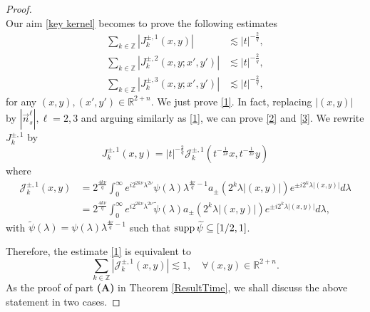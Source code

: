 \documentclass[10pt,a4paper]{amsart}
\def\supp{\hbox{supp\,}}
\begin{document}
\begin{proof}
\begin{equation*}
\end{equation*}
Our aim \eqref{key kernel} becomes to prove the following estimates
\begin{align}
\sum_{k\in\mathbb{Z}}|J_k^{\pm,1}(x,y)|&\lesssim |t|^{-\frac{2}{q}},\label{1}\\
\sum_{k\in\mathbb{Z}}|J_k^{\pm,2}(x,y;x',y')|&\lesssim |t|^{-\frac{2}{q}},\label{2}\\
\sum_{k\in\mathbb{Z}}|J_k^{\pm,3}(x,y;x',y')|&\lesssim |t|^{-\frac{2}{q}},\label{3}
\end{align}
for any $(x,y),(x',y')\in\mathbb{R}^{2+n}$. We just prove \eqref{1}. In fact, replacing $|(x,y)|$ by $|\overset{\rightarrow}{n}_s^\ell|, \ell=2,3$ and arguing similarly as \eqref{1}, we can prove \eqref{2} and \eqref{3}. We rewrite $J_k^{\pm,1}$ by
\begin{equation*}
J_k^{\pm,1}(x,y)=|t|^{-\frac{2}{q}}\mathcal{J}_k^{\pm,1}(t^{-\frac{1}{2\nu}}x,t^{-\frac{1}{2\nu}}y)
\end{equation*}
where
\begin{align*}
\mathcal{J}_k^{\pm,1}(x,y)&=2^\frac{4k\nu}{q}\int_0^\infty  e^{i2^{2k\nu}\lambda^{2\nu}} \psi(\lambda)\lambda^{\frac{4\nu}{q}-1}a_{\pm}(2^k\lambda|(x,y)|)e^{\pm i2^k\lambda|(x,y)|}d\lambda\\
&=2^\frac{4k\nu}{q}\int_0^\infty  e^{i2^{2k\nu}\lambda^{2\nu}} \widetilde{\psi}(\lambda)a_{\pm}(2^k\lambda|(x,y)|)e^{\pm i2^k\lambda|(x,y)|}d\lambda,
\end{align*}
with $\widetilde{\psi}(\lambda)=\psi(\lambda)\lambda^{\frac{4\nu}{q}-1}$ such that $\supp \widetilde{\psi}\subseteq [1/2,1]$.

Therefore, the estimate \eqref{1} is equivalent to
\begin{equation}\label{J}
\sum_{k\in\mathbb{Z}}|\mathcal{J}_k^{\pm,1}(x,y)|\lesssim 1,\quad \forall (x,y)\in\mathbb{R}^{2+n}.
\end{equation}
As the proof of part \textbf{(A)} in Theorem \ref{ResultTime}, we shall discuss the above statement in two cases.


\end{proof}
\end{document}
